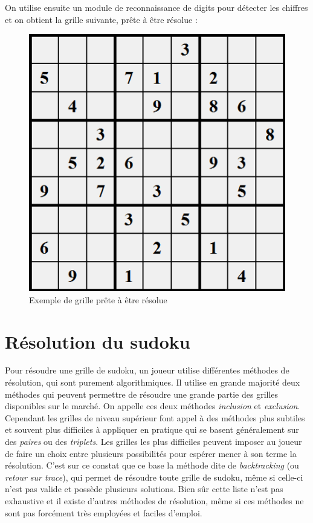 \documentclass[12pt,a4paper]{report}
\begin{document}
On utilise ensuite un module de reconnaissance de digits pour détecter les chiffres et on obtient la grille suivante, prête à être résolue :

\begin{figure}[!h]
 \center
 \includegraphics[scale=0.55]{../pictures/finished.png}
 \caption{Exemple de grille prête à être résolue}
\end{figure}

\newpage
\section{Résolution du sudoku}
\label{Resolution}
Pour résoudre une grille de sudoku, un joueur utilise différentes méthodes de résolution, qui sont purement algorithmiques. Il utilise en grande majorité deux méthodes qui peuvent permettre de résoudre une grande partie des grilles disponibles sur le marché. On appelle ces deux méthodes \emph{inclusion} et \emph{exclusion}. Cependant les grilles de niveau supérieur font appel à des méthodes plus subtiles et souvent plus difficiles à appliquer en pratique qui se basent généralement sur des \emph{paires} ou des \emph{triplets}. Les grilles les plus difficiles peuvent imposer au joueur de faire un choix entre plusieurs possibilités pour espérer mener à son terme la résolution. C'est sur ce constat que ce base la méthode dite de \emph{backtracking} (ou \emph{retour sur trace}), qui permet de résoudre toute grille de sudoku, même si celle-ci n'est pas valide et possède plusieurs solutions. Bien sûr cette liste n'est pas exhaustive et il existe d'autres méthodes de résolution, même si ces méthodes ne sont pas forcément très employées et faciles d'emploi.
\end{document}
